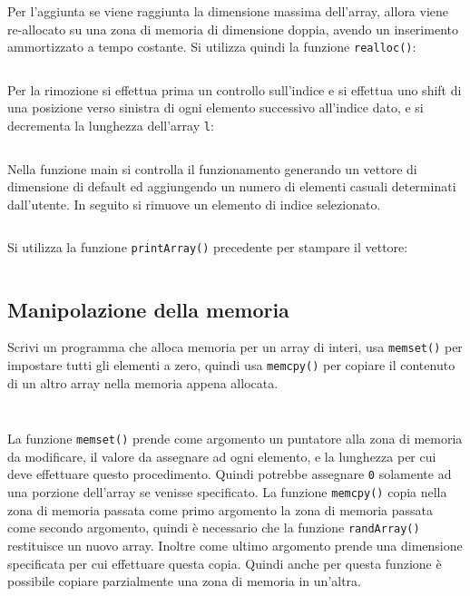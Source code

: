 \documentclass{article}
\numberwithin{equation}{subsection}
\begin{document}
\inputminted[firstline=21, lastline=29]{c}{./"Esercitazione del 19-11-24"/domanda2.c}
Per l'aggiunta se viene raggiunta la dimensione massima dell'array, allora viene 
re-allocato su una zona di memoria di dimensione doppia, avendo un inserimento 
ammortizzato a tempo costante. Si utilizza quindi la funzione \verb|realloc()|:
\inputminted[firstline=33, lastline=40]{c}{./"Esercitazione del 19-11-24"/domanda2.c}
Per la rimozione si effettua prima un controllo sull'indice e si effettua uno shift 
di una posizione verso sinistra di ogni elemento successivo all'indice dato, e si 
decrementa la lunghezza dell'array \verb|l|:
\inputminted[firstline=43, lastline=51]{c}{./"Esercitazione del 19-11-24"/domanda2.c}

Nella funzione main si controlla il funzionamento generando un vettore di dimensione 
di default ed aggiungendo un numero di elementi casuali determinati dall'utente. In seguito si rimuove un elemento di indice selezionato. \inputminted[firstline=66, lastline=81]{c}{./"Esercitazione del 19-11-24"/domanda2.c} 
Si utilizza la funzione \verb|printArray()| precedente per stampare il vettore:
\inputminted[firstline=58, lastline=64]{c}{./"Esercitazione del 19-11-24"/domanda2.c}

\subsection{Manipolazione della memoria}

Scrivi un programma che alloca memoria per un array di interi, usa \verb|memset()| per impostare tutti gli elementi a zero, quindi usa \verb|memcpy()| per copiare il contenuto di un altro array nella memoria appena allocata.

\inputminted[firstline=1, lastline=5]{c}{./"Esercitazione del 19-11-24"/domanda3.c}
\inputminted[firstline=30, lastline=39]{c}{./"Esercitazione del 19-11-24"/domanda3.c}

La funzione \verb|memset()| prende come argomento un puntatore alla zona di memoria da 
modificare, il valore da assegnare ad ogni elemento, e la lunghezza per cui deve 
effettuare questo procedimento. Quindi potrebbe assegnare \verb|0| solamente ad una 
porzione dell'array se venisse specificato. La funzione \verb|memcpy()| copia nella 
zona di memoria passata come primo argomento la zona di memoria passata come 
secondo argomento, quindi è necessario che la funzione \verb|randArray()| restituisce un nuovo array. Inoltre come ultimo argomento prende una dimensione specificata per cui 
effettuare questa copia. Quindi anche per 
questa funzione è possibile copiare parzialmente una zona di memoria in un'altra. 
\end{document}
